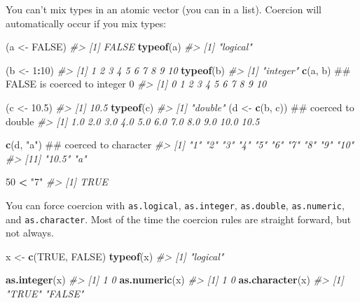 \documentclass[]{book}
\newenvironment{Shaded}{\begin{snugshade}}{\end{snugshade}}
\newcommand{\KeywordTok}[1]{\textcolor[rgb]{0.13,0.29,0.53}{\textbf{#1}}}
\newcommand{\DecValTok}[1]{\textcolor[rgb]{0.00,0.00,0.81}{#1}}
\newcommand{\FloatTok}[1]{\textcolor[rgb]{0.00,0.00,0.81}{#1}}
\newcommand{\StringTok}[1]{\textcolor[rgb]{0.31,0.60,0.02}{#1}}
\newcommand{\CommentTok}[1]{\textcolor[rgb]{0.56,0.35,0.01}{\textit{#1}}}
\newcommand{\OtherTok}[1]{\textcolor[rgb]{0.56,0.35,0.01}{#1}}
\newcommand{\OperatorTok}[1]{\textcolor[rgb]{0.81,0.36,0.00}{\textbf{#1}}}
\newcommand{\NormalTok}[1]{#1}
\theoremstyle{definition}
\theoremstyle{definition}
\theoremstyle{definition}
\theoremstyle{remark}
\begin{document}
You can't mix types in an atomic vector (you can in a list). Coercion
will automatically occur if you mix types:

\begin{Shaded}
\begin{Highlighting}[]
\NormalTok{(a <-}\StringTok{ }\OtherTok{FALSE}\NormalTok{)}
\CommentTok{#> [1] FALSE}
\KeywordTok{typeof}\NormalTok{(a)}
\CommentTok{#> [1] "logical"}

\NormalTok{(b <-}\StringTok{ }\DecValTok{1}\OperatorTok{:}\DecValTok{10}\NormalTok{)}
\CommentTok{#>  [1]  1  2  3  4  5  6  7  8  9 10}
\KeywordTok{typeof}\NormalTok{(b)}
\CommentTok{#> [1] "integer"}
\KeywordTok{c}\NormalTok{(a, b)         ## FALSE is coerced to integer 0}
\CommentTok{#>  [1]  0  1  2  3  4  5  6  7  8  9 10}

\NormalTok{(c <-}\StringTok{ }\FloatTok{10.5}\NormalTok{)}
\CommentTok{#> [1] 10.5}
\KeywordTok{typeof}\NormalTok{(c)}
\CommentTok{#> [1] "double"}
\NormalTok{(d <-}\StringTok{ }\KeywordTok{c}\NormalTok{(b, c))  ## coerced to double}
\CommentTok{#>  [1]  1.0  2.0  3.0  4.0  5.0  6.0  7.0  8.0  9.0 10.0 10.5}

\KeywordTok{c}\NormalTok{(d, }\StringTok{"a"}\NormalTok{)       ## coerced to character}
\CommentTok{#>  [1] "1"    "2"    "3"    "4"    "5"    "6"    "7"    "8"    "9"    "10"  }
\CommentTok{#> [11] "10.5" "a"}

\DecValTok{50} \OperatorTok{<}\StringTok{ "7"}
\CommentTok{#> [1] TRUE}
\end{Highlighting}
\end{Shaded}

You can force coercion with \texttt{as.logical}, \texttt{as.integer},
\texttt{as.double}, \texttt{as.numeric}, and \texttt{as.character}. Most
of the time the coercion rules are straight forward, but not always.

\begin{Shaded}
\begin{Highlighting}[]
\NormalTok{x <-}\StringTok{ }\KeywordTok{c}\NormalTok{(}\OtherTok{TRUE}\NormalTok{, }\OtherTok{FALSE}\NormalTok{)}
\KeywordTok{typeof}\NormalTok{(x)}
\CommentTok{#> [1] "logical"}

\KeywordTok{as.integer}\NormalTok{(x)}
\CommentTok{#> [1] 1 0}
\KeywordTok{as.numeric}\NormalTok{(x)}
\CommentTok{#> [1] 1 0}
\KeywordTok{as.character}\NormalTok{(x)}
\CommentTok{#> [1] "TRUE"  "FALSE"}
\end{Highlighting}
\end{Shaded}
\end{document}
